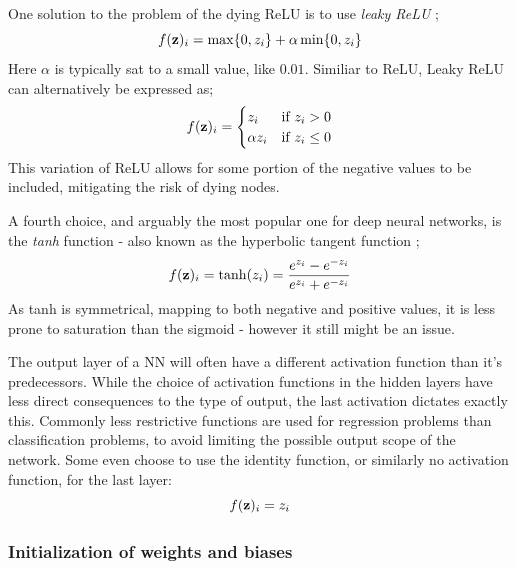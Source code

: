 One solution to the problem of the dying ReLU is to use \textit{leaky ReLU} \citep[p. 190]{Goodfellow-et-al-2016}; 
\begin{equation}
    f(\bold{z})_i=\max\{0, z_i\}+\alpha\min\{0,z_i\}
\end{equation}
Here $\alpha$ is typically sat to a small value, like $0.01$. 
Similiar to ReLU, Leaky ReLU can alternatively be expressed as; 
\begin{equation}
    f(\bold{z})_i = \begin{cases} 
      z_i & \text{if } z_i > 0 \\
      \alpha z_i & \text{if } z_i \leq 0 
   \end{cases}
\end{equation}
This variation of ReLU allows for some portion of the negative values to be included, mitigating the risk of dying nodes. 

A fourth choice, and arguably the most popular one for deep neural networks, is the \textit{tanh} function - also known as the hyperbolic tangent function \citep[Neural Networks]{morten};
\begin{equation}
    f(\bold{z})_i = \tanh(z_i)=\frac{e^{z_i}-e^{-z_i}}{e^{z_i}+e^{-z_i}}
\end{equation}
As tanh is symmetrical, mapping to both negative and positive values, it is less prone to saturation than the sigmoid - however it still might be an issue. 

The output layer of a NN will often have a different activation function than it's predecessors. While the choice of activation functions in the hidden layers have less direct consequences to the type of output, the last activation dictates exactly this.
Commonly less restrictive functions are used for regression problems than classification problems, to avoid limiting the possible output scope of the network. Some even choose to use the identity function, or similarly no activation function, for the last layer:
\begin{equation}
    f(\bold{z})_i=z_i
\end{equation}

\subsubsection{Initialization of weights and biases}\label{sec:NN_init}

